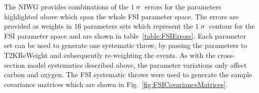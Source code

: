 The NIWG provides combinations of the $1\upsigma$ errors for the parameters highlighted above which span the whole FSI parameter space.  The errors are provided as weights in 16 parameters sets which represent the $1\upsigma$ contour for the FSI parameter space and are shown in table~\ref{table:FSIErrors}.  Each parameter set can be used to generate one systematic throw, by passing the parameters to T2KReWeight and subsequently re-weighting the events.  As with the cross-section model systematics described above, the parameter variations only affect carbon and oxygen.  The FSI systematic throws were used to generate the sample covariance matrices which are shown in Fig.~\ref{fig:FSICovarianceMatrices}.
